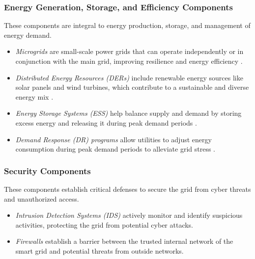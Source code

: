 \documentclass[10pt, journal]{IEEEtran}
\begin{document}
\subsubsection{Energy Generation, Storage, and Efficiency Components}

These components are integral to energy production, storage, and management of energy demand. 

\begin{itemize}

\item {\it Microgrids} are small-scale power grids that can operate independently or in conjunction with the main grid, improving resilience and energy efficiency \cite{lasseter2004microgrid}. 

\item {\it Distributed Energy Resources (DERs)} include renewable energy sources like solar panels and wind turbines, which contribute to a sustainable and diverse energy mix \cite{akorede2010distributed}. 

\item {\it Energy Storage Systems (ESS)} help balance supply and demand by storing excess energy and releasing it during peak demand periods \cite{ribeiro2001energy}. 

\item {\it Demand Response (DR) programs} allow utilities to adjust energy consumption during peak demand periods to alleviate grid stress \cite{zhang2012demand}.

\end{itemize}

\subsubsection{Security Components}

These components establish critical defenses to secure the grid from cyber threats and unauthorized access. 

\begin{itemize}

\item {\it Intrusion Detection Systems (IDS)} actively monitor and identify suspicious activities, protecting the grid from potential cyber attacks. 

\item {\it Firewalls} establish a barrier between the trusted internal network of the smart grid and potential threats from outside networks. 

\end{itemize}
		
\end{document}

